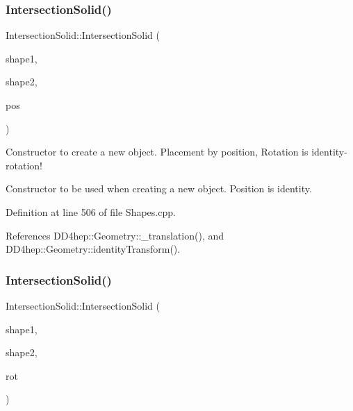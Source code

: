 \subsubsection{\texorpdfstring{Intersection\+Solid()}{IntersectionSolid()}\hspace{0.1cm}{\footnotesize\ttfamily [5/8]}}
{\footnotesize\ttfamily Intersection\+Solid\+::\+Intersection\+Solid (\begin{DoxyParamCaption}\item[{const \hyperlink{namespace_d_d4hep_1_1_geometry_a83de90a8dcc7378ba47d54ef9a6a687b}{Solid} \&}]{shape1,  }\item[{const \hyperlink{namespace_d_d4hep_1_1_geometry_a83de90a8dcc7378ba47d54ef9a6a687b}{Solid} \&}]{shape2,  }\item[{const \hyperlink{namespace_d_d4hep_1_1_geometry_a55083902099d03506c6db01b80404900}{Position} \&}]{pos }\end{DoxyParamCaption})}



Constructor to create a new object. Placement by position, Rotation is identity-\/rotation! 

Constructor to be used when creating a new object. Position is identity. 

Definition at line 506 of file Shapes.\+cpp.



References D\+D4hep\+::\+Geometry\+::\+\_\+translation(), and D\+D4hep\+::\+Geometry\+::identity\+Transform().

\hypertarget{class_d_d4hep_1_1_geometry_1_1_intersection_solid_a350b9cf8a8d458930e25341c1be6f6af}{}\label{class_d_d4hep_1_1_geometry_1_1_intersection_solid_a350b9cf8a8d458930e25341c1be6f6af} 
\subsubsection{\texorpdfstring{Intersection\+Solid()}{IntersectionSolid()}\hspace{0.1cm}{\footnotesize\ttfamily [6/8]}}
{\footnotesize\ttfamily Intersection\+Solid\+::\+Intersection\+Solid (\begin{DoxyParamCaption}\item[{const \hyperlink{namespace_d_d4hep_1_1_geometry_a83de90a8dcc7378ba47d54ef9a6a687b}{Solid} \&}]{shape1,  }\item[{const \hyperlink{namespace_d_d4hep_1_1_geometry_a83de90a8dcc7378ba47d54ef9a6a687b}{Solid} \&}]{shape2,  }\item[{const \hyperlink{namespace_d_d4hep_1_1_geometry_a24667b2b9c3cec3d5239828db4d52189}{Rotation\+Z\+YX} \&}]{rot }\end{DoxyParamCaption})}



